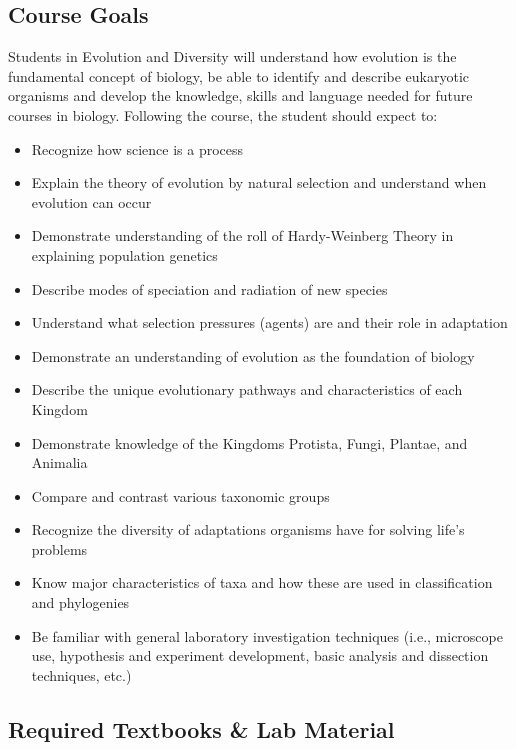 \documentclass{tufte-handout}
\begin{document}
\begin{fullwidth}

\subsection{Course Goals}

Students in Evolution and Diversity will understand how evolution is the fundamental concept of biology, be able to identify and describe eukaryotic organisms and develop the knowledge, skills and language needed for future courses in biology. Following the course, the student should expect to:

\begin{itemize}
	\item Recognize how science is a process
	\item Explain the theory of evolution by natural selection and understand when evolution can occur
	\item Demonstrate understanding of the roll of Hardy-Weinberg Theory in explaining population genetics
	\item Describe modes of speciation and radiation of new species
	\item Understand what selection pressures (agents) are and their role in adaptation
	\item Demonstrate an understanding of evolution as the foundation of biology
	\item Describe the unique evolutionary pathways and characteristics of each Kingdom
	\item Demonstrate knowledge of the Kingdoms Protista, Fungi, Plantae, and Animalia
	\item Compare and contrast various taxonomic groups
	\item Recognize the diversity of adaptations organisms have for solving life's problems
	\item Know major characteristics of taxa and how these are used in classification and phylogenies
	\item Be familiar with general laboratory investigation techniques (i.e., microscope use, hypothesis and experiment development, basic analysis and dissection techniques, etc.)
\end{itemize}

\subsection{Required Textbooks \& Lab Material}


\end{fullwidth}
\end{document}

